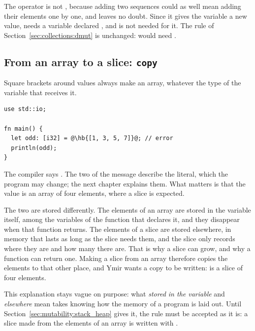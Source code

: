 The operator is not \token{+}, because adding two sequences could as well mean
adding their elements one by one, and \tokennolst{\mtildeascii{}} leaves no
doubt. Since it gives the variable a new value, \tokennolst{\mtildeascii{}=}
needs a variable declared , and  is not needed for it. The
rule of Section~\ref{sec:collections:dmut} is unchanged: 
would need .

\subsection{From an array to a slice: \texttt{copy}}
\label{sec:collections:copy}

Square brackets around values always make an array, whatever the type of the
variable that receives it.

\begin{lstlisting}[style=coloredverbatimError, escapechar=@, caption=An array where a slice is expected]
use std::io;

fn main() {
  let odd: [i32] = @\hb{[1, 3, 5, 7]}@; // error
  println(odd);
}
\end{lstlisting}

The compiler says . The two  of the message describe the literal, which the
program may change; the next chapter explains them. What matters is that the
value is an array of four elements, where a slice is expected.

The two are stored differently. The elements of an array are stored in the
variable itself, among the variables of the function that declares it, and
they disappear when that function returns. The elements of a slice are stored
elsewhere, in memory that lasts as long as the slice needs them, and the slice
only records where they are and how many there are. That is why a slice can
grow, and why a function can return one. Making a slice from an array therefore
copies the elements to that other place, and Ymir wants a copy to be written:
 is a slice of four elements.

This explanation stays vague on purpose: what \textit{stored in the variable}
and \textit{elsewhere} mean takes knowing how the memory of a program is laid
out. Until Section~\ref{sec:mutability:stack_heap} gives it, the rule must be
accepted as it is: a slice made from the elements of an array is written with
.

